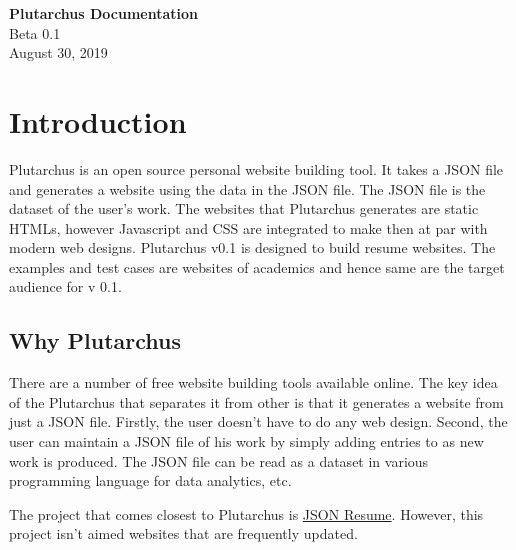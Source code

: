 \documentclass[12pt]{article}
\newcommand{\blank}[1]{\hspace*{#1}\linebreak[0]}
\begin{document}
\begin{titlepage}
    \begin{center}
        \vspace*{1cm}
        \Huge
        \textbf{Plutarchus Documentation}
        \\
        \LARGE
        \vspace{0.5cm}
         Beta 0.1
         \\
        \vspace{1.5cm}
        \vspace{8.5cm}
        \vspace{1cm}
        \hspace{2cm}
        \blank{6cm} August 30, 2019
    \end{center}
 \end{titlepage}
 
    \tableofcontents
    \newpage
    \section{Introduction}

    Plutarchus is an open source personal website building tool. It takes a JSON file and generates a website using the data in the JSON file. The JSON file is the dataset of the user's work. The websites that Plutarchus generates are static HTMLs, however Javascript and CSS are integrated to make then at par with modern web designs. Plutarchus v0.1 is designed to build resume websites. The examples and test cases are websites of academics and hence same are the target audience for v 0.1.

 
    \subsection{Why Plutarchus}

    There are a number of free website building tools available online. The key idea of the Plutarchus that separates it from other is that it generates a website from just a JSON file. Firstly, the user doesn't have to do any web design. Second, the user can maintain a JSON file of his work by simply adding entries to as new work is produced. The JSON file can be read as a dataset in various programming language for data analytics, etc. 

    The project that comes closest to Plutarchus is \href{http://jsonresume.org/}{JSON Resume}.
    However, this project isn't aimed websites that are frequently updated.   
\end{document}
